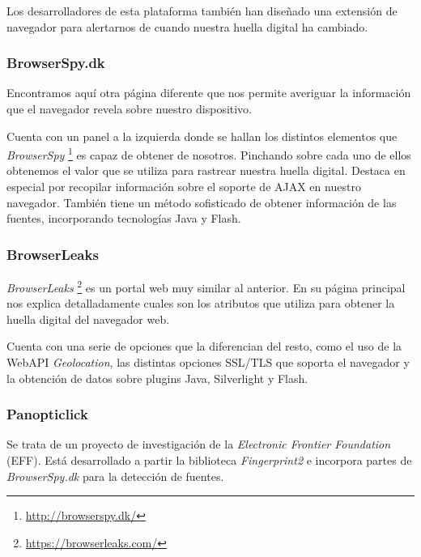 Los desarrolladores de esta plataforma también han diseñado una extensión de navegador para alertarnos de cuando nuestra huella digital ha cambiado. \par 

\subsubsection{BrowserSpy.dk}

Encontramos aquí otra página diferente que nos permite averiguar la información que el navegador revela sobre nuestro dispositivo. \par 

Cuenta con un panel a la izquierda donde se hallan los distintos elementos que \textit{BrowserSpy} \footnote{\url{http://browserspy.dk/}} es capaz de obtener de nosotros. Pinchando sobre cada uno de ellos obtenemos el valor que se utiliza para rastrear nuestra huella digital. Destaca en especial por recopilar información sobre el soporte de AJAX en nuestro navegador. También tiene un método sofisticado de obtener información de las fuentes, incorporando tecnologías Java y Flash. \par 

\subsubsection{BrowserLeaks}

\textit{BrowserLeaks} \footnote{\url{https://browserleaks.com/}} es un portal web muy similar al anterior. En su página principal nos explica detalladamente cuales son los atributos que utiliza para obtener la huella digital del navegador web. \par 

Cuenta con una serie de opciones que la diferencian del resto, como el uso de la WebAPI \textit{Geolocation}, las distintas opciones SSL/TLS que soporta el navegador y la obtención de datos sobre plugins Java, Silverlight y Flash. \par 

\subsubsection{Panopticlick}

Se trata de un proyecto de investigación de la \textit{Electronic Frontier Foundation} (EFF). Está desarrollado a partir la biblioteca \textit{Fingerprint2} \cite{fingerprintjs2} e incorpora partes de \textit{BrowserSpy.dk} \cite{browserSpy} para la detección de fuentes. \par 

